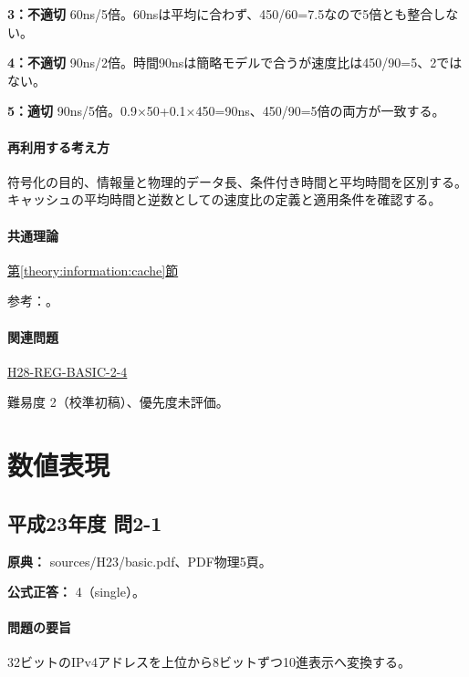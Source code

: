 \noindent\textbf{3：不適切} 60ns/5倍。60nsは平均に合わず、450/60=\allowbreak{}7.5なので5倍とも整合しない。\par

\noindent\textbf{4：不適切} 90ns/2倍。時間90nsは簡略モデルで合うが速度比は450/90=\allowbreak{}5、2ではない。\par

\noindent\textbf{5：適切} 90ns/5倍。0.9×50+0.1×450=\allowbreak{}90ns、450/90=\allowbreak{}5倍の両方が一致する。\par

\paragraph{再利用する考え方} 符号化の目的、情報量と物理的データ長、条件付き時間と平均時間を区別する。キャッシュの平均時間と逆数としての速度比の定義と適用条件を確認する。

\paragraph{共通理論} \hyperref[theory:information:cache]{第\ref*{theory:information:cache}節}

\par 参考：\cite{info_cache}。

\paragraph{関連問題} \hyperref[q:h28-reg-basic-2-4]{H28-REG-BASIC-2-4}

\par 難易度 2（校準初稿）、優先度未評価。

\section{数値表現}

\subsection{平成23年度 問2-1}
\label{q:h23-reg-basic-2-1}

\noindent\textbf{原典：} sources/H23/basic.pdf、PDF物理5頁。

\textbf{公式正答：} 4（single）。

\paragraph{問題の要旨} 32ビットのIPv4アドレスを上位から8ビットずつ10進表示へ変換する。

